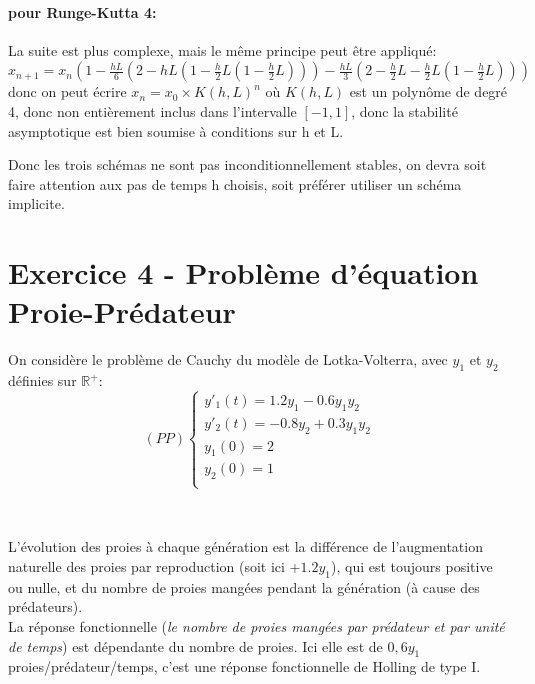 \documentclass[a4paper,12pt,landscape]{article}
\begin{document}
\paragraph{pour Runge-Kutta 4:}
La suite est plus complexe, mais le même principe peut être appliqué:\\ $x_{n+1}=x_n(1-\frac{hL}{6}(2-hL(1-\frac{h}{2}L(1-\frac{h}{2}L)))-\frac{hL}{3}(2-\frac{h}{2}L-\frac{h}{2}L(1-\frac{h}{2}L)))$ donc on peut écrire $x_n=x_0\times K(h,L)^n$ où $K(h,L)$ est un polynôme de degré 4, donc non entièrement inclus dans l'intervalle $[-1,1]$, donc la stabilité asymptotique est bien soumise à conditions sur h et L.


Donc les trois schémas ne sont pas inconditionnellement stables, on devra soit faire attention aux pas de temps h choisis, soit préférer utiliser un schéma implicite.

\subsection{}

\newpage
\section{Exercice 4 - Problème d'équation Proie-Prédateur}

On considère le problème de Cauchy du modèle de Lotka-Volterra, avec $y_1$ et $y_2$ définies sur $\mathbb{R}^+$:
$$
(PP)
\left \{
\begin{array}{l}
	y'_1(t)=1.2y_1-0.6y_1y_2\\
	y'_2(t)=-0.8y_2+0.3y_1y_2\\
	y_1(0)=2\\
	y_2(0)=1\\
\end{array}
\right.$$\\
\subsection{}

L'évolution des proies à chaque génération est la différence de l'augmentation naturelle des proies par reproduction (soit ici +$1.2y_1$), qui est toujours positive ou nulle, et du nombre de proies mangées pendant la génération (à cause des prédateurs).\\

La réponse fonctionnelle (\textit{le nombre de proies mangées par prédateur et par unité de temps}) est dépendante du nombre de proies. Ici elle est de $0,6y_1$ proies/prédateur/temps, c'est une réponse fonctionnelle de Holling de type I.\\
\end{document}
